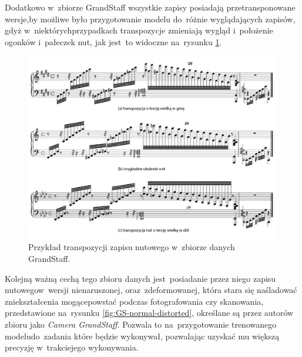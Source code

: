 \newpage

Dodatkowo w~zbiorze GrandStaff wszystkie zapisy posiadają przetransponowane wersje,\linebreak by możliwe było przygotowanie modelu do~różnie wyglądających zapisów, gdyż w~niektórych\linebreak przypadkach transpozycje zmieniają wygląd i~położenie ogonków i~pałeczek nut, jak jest~to widoczne na~rysunku \ref{fig:score-transposition}.

\begin{figure}[htb]
	\centering
	\includegraphics[width=14cm]{images/grandstaff-transpozycje.jpg}
	\caption{Przykład transpozycji zapisu nutowego w~zbiorze danych GrandStaff.}
	\label{fig:score-transposition}
\end{figure}

Kolejną ważną cechą tego zbioru danych jest~posiadanie przez niego zapisu nutowego\linebreak w~wersji nienaruszonej, oraz~zdeformowanej, która stara się naśladować zniekształcenia mogące\linebreak powstać podczas fotografowania czy skanowania, przedstawione na~rysunku \ref{fig:GS-normal-distorted}, określane są przez autorów zbioru jako \textit{Camera GrandStaff}. Pozwala to na~przygotowanie trenowanego modelu\linebreak do~zadania które będzie wykonywał, pozwalając uzyskać mu większą precyzję w~trakcie\linebreak jego wykonywania.

